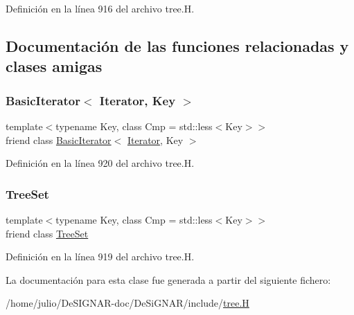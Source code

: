 Definición en la línea 916 del archivo tree.\+H.



\subsection{Documentación de las funciones relacionadas y clases amigas}
\mbox{\label{class_designar_1_1_tree_set_1_1_iterator_a0b375a570add16b09037ce1773f0ddbb}} 
\subsubsection{\texorpdfstring{Basic\+Iterator$<$ Iterator, Key $>$}{BasicIterator< Iterator, Key >}}
{\footnotesize\ttfamily template$<$typename Key, class Cmp = std\+::less$<$\+Key$>$$>$ \\
friend class \hyperlink{class_designar_1_1_basic_iterator}{Basic\+Iterator}$<$ \hyperlink{class_designar_1_1_tree_set_1_1_iterator}{Iterator}, Key $>$\hspace{0.3cm}{\ttfamily [friend]}}



Definición en la línea 920 del archivo tree.\+H.

\mbox{\label{class_designar_1_1_tree_set_1_1_iterator_a7caa42294700d2a60905ec3458a7cd8a}} 
\subsubsection{\texorpdfstring{Tree\+Set}{TreeSet}}
{\footnotesize\ttfamily template$<$typename Key, class Cmp = std\+::less$<$\+Key$>$$>$ \\
friend class \hyperlink{class_designar_1_1_tree_set}{Tree\+Set}\hspace{0.3cm}{\ttfamily [friend]}}



Definición en la línea 919 del archivo tree.\+H.



La documentación para esta clase fue generada a partir del siguiente fichero\+:\begin{DoxyCompactItemize}
\item 
/home/julio/\+De\+S\+I\+G\+N\+A\+R-\/doc/\+De\+Si\+G\+N\+A\+R/include/\hyperlink{tree_8_h}{tree.\+H}\end{DoxyCompactItemize}
